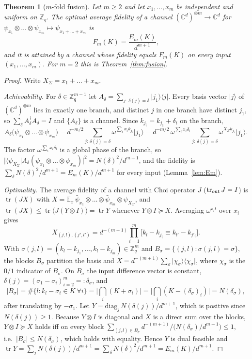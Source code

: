 \documentclass[11pt]{article}
\newcommand{\Z}{\mathbb{Z}}
\newcommand{\C}{\mathbb{C}}
\newcommand{\E}{\mathbb{E}}
\newcommand{\tr}{\operatorname{tr}}
\newcommand{\ket}[1]{\lvert #1\rangle}
\newcommand{\bra}[1]{\langle #1\rvert}
\newtheorem{theorem}{Theorem}
\theoremstyle{definition}
\theoremstyle{remark}
\begin{document}
\begin{theorem}[$m$-fold fusion]\label{thm:fusionm}
Let $m\ge2$ and let $x_1,\dots,x_m$ be independent and uniform on $\Z_q$. The optimal average fidelity of a channel
$(\C^d)^{\otimes m}\to\C^d$ for $\psi_{x_1}\otimes\dots\otimes\psi_{x_m}\mapsto\psi_{x_1+\dots+x_m}$ is
\[
F_m(K)=\frac{E_m(K)}{d^{m+1}} ,
\]
and it is attained by a channel whose fidelity equals $F_m(K)$ on \emph{every} input $(x_1,\dots,x_m)$. For $m=2$ this is
Theorem~\ref{thm:fusion}.
\end{theorem}
\begin{proof}
Write $X_\Sigma=x_1+\dots+x_m$.

\emph{Achievability.} For $\delta\in\Z_q^{m-1}$ let $A_\delta=\sum_{j:\,\delta(j)=\delta}\ket{j_1}\bra{j}$. Every basis vector $\ket j$ of
$(\C^d)^{\otimes m}$ lies in exactly one branch, and distinct $j$ in one branch have distinct $j_1$, so
$\sum_\delta A_\delta^\dagger A_\delta=I$ and $\{A_\delta\}$ is a channel. Since $k_{j_i}=k_{j_1}+\delta_i$ on the branch,
\[
A_\delta\big(\psi_{x_1}\otimes\dots\otimes\psi_{x_m}\big)=d^{-m/2}\sum_{j:\,\delta(j)=\delta}\omega^{\sum_ix_ik_{j_i}}\ket{j_1}
=d^{-m/2}\,\omega^{\sum_ix_i\delta_i}\sum_{j:\,\delta(j)=\delta}\omega^{X_\Sigma k_{j_1}}\ket{j_1} .
\]
The factor $\omega^{\sum_ix_i\delta_i}$ is a global phase of the branch, so
$\big|\bra{\psi_{X_\Sigma}}A_\delta(\psi_{x_1}\otimes\dots\otimes\psi_{x_m})\big|^2=N(\delta)^2/d^{m+1}$, and the fidelity is
$\sum_\delta N(\delta)^2/d^{m+1}=E_m(K)/d^{m+1}$ for every input (Lemma~\ref{lem:Em}).

\emph{Optimality.} The average fidelity of a channel with Choi operator $J$ ($\tr_{\rm out}J=I$) is $\tr(JX)$ with
$X=\E_{x}\,\bar\psi_{x_1}\otimes\dots\otimes\bar\psi_{x_m}\otimes\psi_{X_\Sigma}$, and $\tr(JX)\le\tr\big(J(Y\otimes I)\big)=\tr Y$
whenever $Y\otimes I\succeq X$. Averaging $\omega^{x_i t}$ over $x_i$ gives
\[
X_{(j,l),(j',l')}=d^{-(m+1)}\prod_{i=1}^m\big[k_l-k_{j_i}\equiv k_{l'}-k_{j'_i}\big] .
\]
With $\sigma(j,l)=(k_l-k_{j_1},\dots,k_l-k_{j_m})\in\Z_q^m$ and $B_\sigma=\{(j,l):\sigma(j,l)=\sigma\}$, the blocks $B_\sigma$
partition the basis and $X=d^{-(m+1)}\sum_\sigma\ket{\chi_\sigma}\bra{\chi_\sigma}$, where $\chi_\sigma$ is the $0/1$ indicator of
$B_\sigma$. On $B_\sigma$ the input difference vector is constant, $\delta(j)=(\sigma_1-\sigma_i)_{i=2}^m=:\delta_\sigma$, and
\[
|B_\sigma|=\#\{l:k_l-\sigma_i\in K\ \forall i\}=\Big|\bigcap_i(K+\sigma_i)\Big|=\Big|\bigcap_i(K-(\delta_\sigma)_i)\Big|=N(\delta_\sigma),
\]
after translating by $-\sigma_1$. Let $Y=\mathrm{diag}_j\,N(\delta(j))/d^{m+1}$, which is positive since $N(\delta(j))\ge1$. Because $Y\otimes I$
is diagonal and $X$ is a direct sum over the blocks, $Y\otimes I\succeq X$ holds iff on every block
$\sum_{(j,l)\in B_\sigma}d^{-(m+1)}\big/\big(N(\delta_\sigma)/d^{m+1}\big)\le1$, i.e.\ $|B_\sigma|\le N(\delta_\sigma)$, which holds with
equality. Hence $Y$ is dual feasible and $\tr Y=\sum_jN(\delta(j))/d^{m+1}=\sum_\delta N(\delta)^2/d^{m+1}=E_m(K)/d^{m+1}$.
\end{proof}
\end{document}
